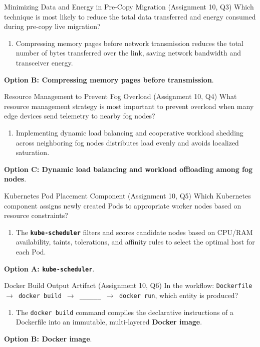 \begin{solved}{Minimizing Data and Energy in Pre-Copy Migration (Assignment 10, Q3)}
\Given Which technique is most likely to reduce the total data transferred and energy consumed during pre-copy live migration?
\Steps
\begin{enumerate}[leftmargin=*]
  \item Compressing memory pages before network transmission reduces the total number of bytes transferred over the link, saving network bandwidth and transceiver energy.
\end{enumerate}
\Answer \textbf{Option B: Compressing memory pages before transmission}.
\end{solved}

\begin{solved}{Resource Management to Prevent Fog Overload (Assignment 10, Q4)}
\Given What resource management strategy is most important to prevent overload when many edge devices send telemetry to nearby fog nodes?
\Steps
\begin{enumerate}[leftmargin=*]
  \item Implementing dynamic load balancing and cooperative workload shedding across neighboring fog nodes distributes load evenly and avoids localized saturation.
\end{enumerate}
\Answer \textbf{Option C: Dynamic load balancing and workload offloading among fog nodes}.
\end{solved}

\begin{solved}{Kubernetes Pod Placement Component (Assignment 10, Q5)}
\Given Which Kubernetes component assigns newly created Pods to appropriate worker nodes based on resource constraints?
\Steps
\begin{enumerate}[leftmargin=*]
  \item The \textbf{\texttt{kube-scheduler}} filters and scores candidate nodes based on CPU/RAM availability, taints, tolerations, and affinity rules to select the optimal host for each Pod.
\end{enumerate}
\Answer \textbf{Option A: \texttt{kube-scheduler}}.
\end{solved}

\begin{solved}{Docker Build Output Artifact (Assignment 10, Q6)}
\Given In the workflow: \texttt{Dockerfile $\to$ docker build $\to$ \_\_\_\_\_\_ $\to$ docker run}, which entity is produced?
\Steps
\begin{enumerate}[leftmargin=*]
  \item The \texttt{docker build} command compiles the declarative instructions of a Dockerfile into an immutable, multi-layered \textbf{Docker image}.
\end{enumerate}
\Answer \textbf{Option B: Docker image}.
\end{solved}

